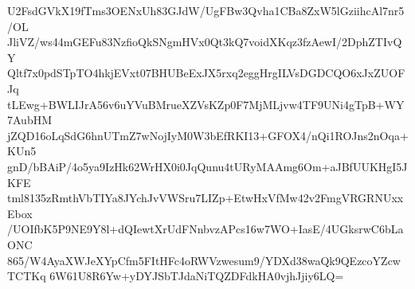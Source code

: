 U2FsdGVkX19fTms3OENxUh83GJdW/UgFBw3Qvha1CBa8ZxW5lGziihcAl7nr5/OL
JliVZ/ws44mGEFu83NzfioQkSNgmHVx0Qt3kQ7voidXKqz3fzAewI/2DphZTIvQY
Qltf7x0pdSTpTO4hkjEVxt07BHUBeExJX5rxq2eggHrgILVsDGDCQO6xJxZUOFJq
tLEwg+BWLIJrA56v6uYVuBMrueXZVsKZp0F7MjMLjvw4TF9UNi4gTpB+WY7AubHM
jZQD16oLqSdG6hnUTmZ7wNojIyM0W3bEfRKI13+GFOX4/nQi1ROJns2nOqa+KUn5
gnD/bBAiP/4o5ya9IzHk62WrHX0i0JqQunu4tURyMAAmg6Om+aJBfUUKHgI5JKFE
tml8135zRmthVbTIYa8JYchJvVWSru7LIZp+EtwHxVfMw42v2FmgVRGRNUxxEbox
/UOIfbK5P9NE9Y8l+dQIewtXrUdFNnbvzAPcs16w7WO+IasE/4UGksrwC6bLaONC
865/W4AyaXWJeXYpCfm5FItHFc4oRWVzwesum9/YDXd38waQk9QEzcoYZcwTCTKq
6W61U8R6Yw+yDYJSbTJdaNiTQZDFdkHA0vjhJjiy6LQ=
